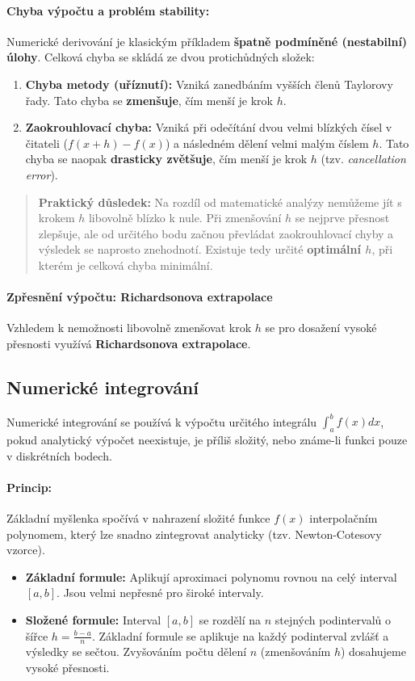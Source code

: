 \paragraph*{Chyba výpočtu a problém stability:}
Numerické derivování je klasickým příkladem \textbf{špatně podmíněné (nestabilní) úlohy}. Celková chyba se skládá ze dvou protichůdných složek:
\begin{enumerate}
    \item \textbf{Chyba metody (uříznutí):} Vzniká zanedbáním vyšších členů Taylorovy řady. Tato chyba se \textbf{zmenšuje}, čím menší je krok $h$.
    \item \textbf{Zaokrouhlovací chyba:} Vzniká při odečítání dvou velmi blízkých čísel v čitateli ($f(x+h) - f(x)$) a následném dělení velmi malým číslem $h$. Tato chyba se naopak \textbf{drasticky zvětšuje}, čím menší je krok $h$ (tzv. \textit{cancellation error}).
\end{enumerate}

\begin{quote}
\textbf{Praktický důsledek:}
Na rozdíl od matematické analýzy nemůžeme jít s krokem $h$ libovolně blízko k nule. Při zmenšování $h$ se nejprve přesnost zlepšuje, ale od určitého bodu začnou převládat zaokrouhlovací chyby a výsledek se naprosto znehodnotí. Existuje tedy určité \textbf{optimální $h$}, při kterém je celková chyba minimální.
\end{quote}



\paragraph*{Zpřesnění výpočtu: Richardsonova extrapolace}
Vzhledem k nemožnosti libovolně zmenšovat krok $h$ se pro dosažení vysoké přesnosti využívá \textbf{Richardsonova extrapolace}.

\subsection{Numerické integrování}
Numerické integrování se používá k výpočtu určitého integrálu $\int_a^b f(x) dx$, pokud analytický výpočet neexistuje, je příliš složitý, nebo známe-li funkci pouze v diskrétních bodech.

\paragraph*{Princip:}
Základní myšlenka spočívá v nahrazení složité funkce $f(x)$ interpolačním polynomem, který lze snadno zintegrovat analyticky (tzv. Newton-Cotesovy vzorce).
\begin{itemize}
    \item \textbf{Základní formule:} Aplikují aproximaci polynomu rovnou na celý interval $[a, b]$. Jsou velmi nepřesné pro široké intervaly.
    \item \textbf{Složené formule:} Interval $[a, b]$ se rozdělí na $n$ stejných podintervalů o šířce $h = \frac{b-a}{n}$. Základní formule se aplikuje na každý podinterval zvlášť a výsledky se sečtou. Zvyšováním počtu dělení $n$ (zmenšováním $h$) dosahujeme vysoké přesnosti.
\end{itemize}

